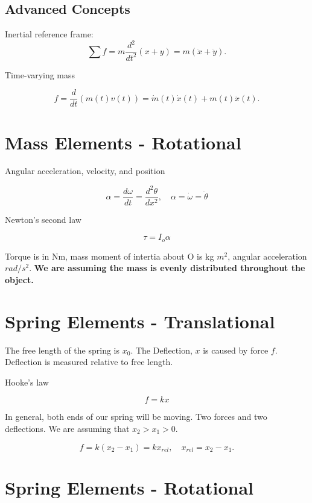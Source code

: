 \documentclass[12pt, a4paper]{report}
\begin{document}
  \subsection{Advanced Concepts}
  Inertial reference frame:
  \[
      \sum f = m \frac{d^2}{dt^2}(x + y) = m (\ddot x + \ddot y)
    .\]

  Time-varying mass

  \[
      f = \frac{d}{dt} (m(t)v(t)) = \dot m(t) \dot x(t) + m(t) \ddot x(t)
    .\]



  \section{Mass Elements - Rotational}

  Angular acceleration, velocity, and position

  \begin{equation}
    \alpha = \frac{d \omega}{dt} = \frac{d^2 \theta}{dx^2}, \quad \alpha = \dot \omega = \ddot \theta
  \end{equation}

  Newton's second law

  \begin{equation}
    \tau = I_o \alpha
  \end{equation}

  Torque is in Nm, mass moment of intertia about O is kg $m^2$, angular acceleration $rad/s^2$. \textbf{We are assuming the mass is evenly distributed throughout the object.}

  \section{Spring Elements - Translational}

  The free length of the spring is $ x_0. $ The Deflection, $ x $ is caused by force $ f. $ Deflection is measured relative to free length.

  Hooke's law

  \begin{equation}
    f = kx
  \end{equation}

  In general, both ends of our spring will be moving. Two forces and two deflections. We are assuming that $ x_2 > x_1 > 0. $

  \[
      f = k (x_2 - x_1) = kx_{rel}, \quad x_{rel} = x_2 - x_1
    .\]

  \section{Spring Elements - Rotational}
\end{document}

